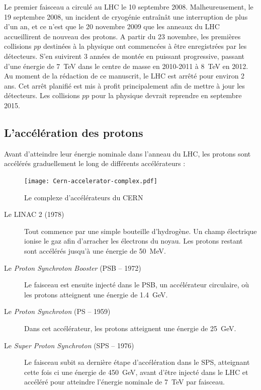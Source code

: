 Le premier faisceau a circulé au LHC le 10 septembre 2008. Malheureusement, le 19 septembre 2008, un incident de cryogénie entraînât une interruption de plus d'un an, et ce n'est que le 20 novembre 2009 que les anneaux du LHC accueillirent de nouveau des protons. A partir du 23 novembre, les premières collisions $pp$ destinées à la physique ont commencées à être enregistrées par les détecteurs. S'en suivirent 3 années de montée en puissant progressive, passant d'une énergie de \SI{7}{\TeV} dans le centre de masse en 2010-2011 à \SI{8}{\TeV} en 2012. Au moment de la rédaction de ce manuscrit, le LHC est arrêté pour environ 2 ans. Cet arrêt planifié est mis à profit principalement afin de mettre à jour les détecteurs. Les collisions $pp$ pour la physique devrait reprendre en septembre 2015.

\subsection{L'accélération des protons}
Avant d'atteindre leur énergie nominale dans l'anneau du LHC, les protons sont accélérés graduellement le long de différents accélérateurs :

\begin{figure} \centering
  \texttt{[image: Cern-accelerator-complex.pdf]}
  \caption{Le complexe d'accélérateurs du CERN}
  \label{fig:lhc_complex}
\end{figure}

\begin{description}
  \item[Le LINAC 2 (1978)] Tout commence par une simple bouteille d'hydrogène. Un champ électrique ionise le gaz afin d'arracher les électrons du noyau. Les protons restant sont accélérés jusqu'à une énergie de \SI{50}{\MeV}.
  \item[Le \emph{Proton Synchroton Booster} (PSB -- 1972)] Le faisceau est ensuite injecté dans le PSB, un accélérateur circulaire, où les protons atteignent une énergie de \SI{1.4}{\GeV}.
  \item[Le \emph{Proton Synchroton} (PS -- 1959)] Dans cet accélérateur, les protons atteignent une énergie de \SI{25}{GeV}.
  \item[Le \emph{Super Proton Synchroton} (SPS -- 1976)] Le faisceau subit sa dernière étape d'accélération dans le SPS, atteignant cette fois ci une énergie de \SI{450}{\GeV}, avant d'être injecté dans le LHC et accéléré pour atteindre l'énergie nominale de \SI{7}{\TeV} par faisceau.
\end{description}

